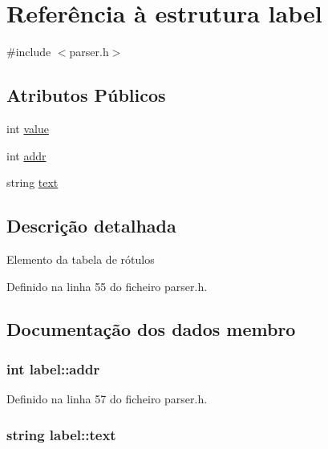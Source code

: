 \hypertarget{structlabel}{\section{Referência à estrutura label}
\label{structlabel}
}


{\ttfamily \#include $<$parser.\-h$>$}

\subsection*{Atributos Públicos}
\begin{DoxyCompactItemize}
\item 
int \hyperlink{structlabel_ac0cdaf20932b7fe75988a1d08510b72c}{value}
\item 
int \hyperlink{structlabel_af670c52b4f6b3aeaadc0ec95334e6e52}{addr}
\item 
string \hyperlink{structlabel_a119fc486bd92631742a9fe2cf278d4df}{text}
\end{DoxyCompactItemize}


\subsection{Descrição detalhada}
Elemento da tabela de rótulos 

Definido na linha 55 do ficheiro parser.\-h.



\subsection{Documentação dos dados membro}
\hypertarget{structlabel_af670c52b4f6b3aeaadc0ec95334e6e52}{
\subsubsection[{addr}]{\setlength{\rightskip}{0pt plus 5cm}int label\-::addr}}\label{structlabel_af670c52b4f6b3aeaadc0ec95334e6e52}


Definido na linha 57 do ficheiro parser.\-h.

\hypertarget{structlabel_a119fc486bd92631742a9fe2cf278d4df}{
\subsubsection[{text}]{\setlength{\rightskip}{0pt plus 5cm}string label\-::text}}\label{structlabel_a119fc486bd92631742a9fe2cf278d4df}


